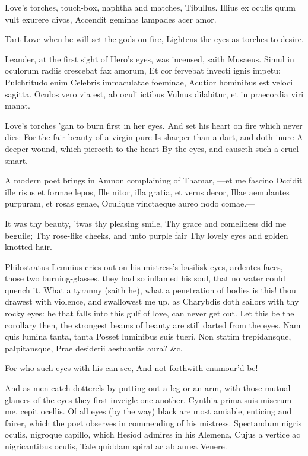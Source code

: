 {Love's torches, touch-box, naphtha and matches, Tibullus.
Illius ex oculis quum vult exurere divos,
Accendit geminas lampades acer amor.

Tart Love when he will set the gods on fire,
Lightens the eyes as torches to desire.

Leander, at the first sight of Hero's eyes, was incensed, saith
Musaeus.
Simul in oculorum radiis crescebat fax amorum,
Et cor fervebat invecti ignis impetu;
Pulchritudo enim Celebris immaculatae foeminae,
Acutior hominibus est veloci sagitta.
Oculos vero via est, ab oculi ictibus
Vulnus dilabitur, et in praecordia viri manat.

Love's torches 'gan to burn first in her eyes.
And set his heart on fire which never dies:
For the fair beauty of a virgin pure
Is sharper than a dart, and doth inure
A deeper wound, which pierceth to the heart
By the eyes, and causeth such a cruel smart.

A modern poet brings in Amnon complaining of Thamar,
---et me fascino
Occidit ille risus et formae lepos,
Ille nitor, illa gratia, et verus decor,
Illae aemulantes purpuram, et rosas genae,
Oculique vinctaeque aureo nodo comae.---

It was thy beauty, 'twas thy pleasing smile,
Thy grace and comeliness did me beguile;
Thy rose-like cheeks, and unto purple fair
Thy lovely eyes and golden knotted hair.

Philostratus Lemnius cries out on his mistress's basilisk eyes,
ardentes faces, those two burning-glasses, they had so inflamed his
soul, that no water could quench it. What a tyranny (saith he), what a
penetration of bodies is this! thou drawest with violence, and
swallowest me up, as Charybdis doth sailors with thy rocky eyes: he
that falls into this gulf of love, can never get out. Let this be the
corollary then, the strongest beams of beauty are still darted from the
eyes.
Nam quis lumina tanta, tanta
Posset luminibus suis tueri,
Non statim trepidansque, palpitansque,
Prae desiderii aestuantis aura? \&c.

For who such eyes with his can see,
And not forthwith enamour'd be!

And as men catch dotterels by putting out a leg or an arm, with those
mutual glances of the eyes they first inveigle one another.
Cynthia prima suis miserum me, cepit ocellis. Of all eyes (by the
way) black are most amiable, enticing and fairer, which the poet
observes in commending of his mistress. Spectandum nigris oculis,
nigroque capillo, which Hesiod admires in his Alemena,
Cujus a vertice ac nigricantibus oculis,
Tale quiddam spiral ac ab aurea Venere.

}
